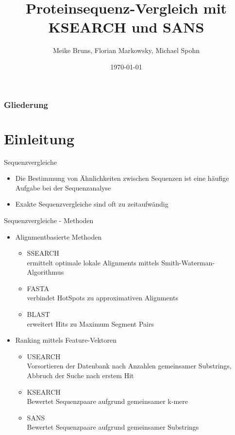 \documentclass[xcolor=dvipsnames, aspectratio=1610]{beamer}
\author{Meike Bruns, Florian Markowsky, Michael Spohn}
\title{Proteinsequenz-Vergleich mit KSEARCH und SANS}
\date{\today}
\begin{document}
\maketitle

\begin{frame}
	\frametitle{Gliederung}
	\tableofcontents
\end{frame}

\section{Einleitung}

\begin{frame}{Sequenzvergleiche}
  \begin{itemize}
    \item Die Bestimmung von Ähnlichkeiten zwischen Sequenzen ist eine häufige Aufgabe bei der Sequenzanalyse 
    \item Exakte Sequenzvergleiche sind oft zu zeitaufwändig 
  \end{itemize}
\end{frame}

\begin{frame}{Sequenzvergleiche - Methoden}
  \begin{itemize}
    \item Alignmentbasierte Methoden
      \begin{itemize}
        \item SSEARCH\\
              \scriptsize ermittelt optimale lokale Alignments mittels Smith-Waterman-Algorithmus                 
        \item \normalsize FASTA\\
              \scriptsize verbindet HotSpots zu approximativen Alignments            
        \item \normalsize BLAST\\
              \scriptsize erweitert Hits zu Maximum Segment Pairs
       \end{itemize}
    \item \normalsize Ranking mittels Feature-Vektoren
      \begin{itemize}
        \item USEARCH\\
              \scriptsize Vorsortieren der Datenbank nach Anzahlen gemeinsamer Substrings, Abbruch der Suche nach erstem    Hit

        \item \normalsize KSEARCH \\
              \scriptsize Bewertet Sequenzpaare aufgrund gemeinsamer k-mere
        \item \normalsize SANS\\
              \scriptsize Bewertet Sequenzpaare aufgrund gemeinsamer Substrings
      \end{itemize}
  \end{itemize}
\end{frame}
\end{document}
